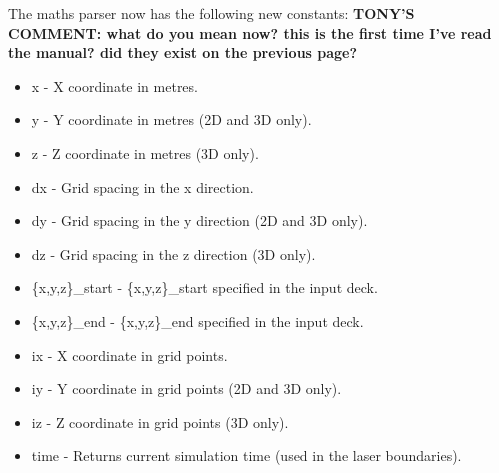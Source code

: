 \documentclass[12pt,a4paper]{article}
\newcommand{\tony}[1]{{\color{warwickred} \bf{TONY'S COMMENT:} \bf{#1}}\\}
\begin{document}
The maths parser now has the following new constants:
\tony{what do you mean now? this is the first time I've read the manual?
did they exist on the previous page?}
\begin{itemize}
\item x - X coordinate in metres.
\item y - Y coordinate in metres (2D and 3D only).
\item z - Z coordinate in metres (3D only).
\item dx - Grid spacing in the x direction.
\item dy - Grid spacing in the y direction (2D and 3D only).
\item dz - Grid spacing in the z direction (3D only).
\item \{x,y,z\}\_start - \{x,y,z\}\_start specified in the input deck.
\item \{x,y,z\}\_end - \{x,y,z\}\_end specified in the input deck.
\item ix - X coordinate in grid points.
\item iy - Y coordinate in grid points (2D and 3D only).
\item iz - Z coordinate in grid points (3D only).
\item time - Returns current simulation time (used in the laser boundaries).
\end{itemize}
\end{document}
